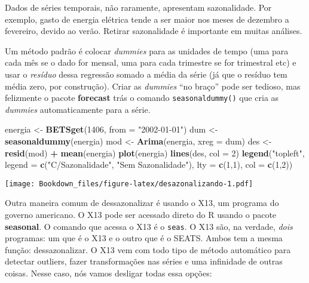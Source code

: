 \documentclass[
]{book}
\newenvironment{Shaded}{\begin{snugshade}}{\end{snugshade}}
\newcommand{\DataTypeTok}[1]{\textcolor[rgb]{0.13,0.29,0.53}{#1}}
\newcommand{\DecValTok}[1]{\textcolor[rgb]{0.00,0.00,0.81}{#1}}
\newcommand{\KeywordTok}[1]{\textcolor[rgb]{0.13,0.29,0.53}{\textbf{#1}}}
\newcommand{\NormalTok}[1]{#1}
\newcommand{\OperatorTok}[1]{\textcolor[rgb]{0.81,0.36,0.00}{\textbf{#1}}}
\newcommand{\StringTok}[1]{\textcolor[rgb]{0.31,0.60,0.02}{#1}}
\begin{document}
Dados de séries temporais, não raramente, apresentam sazonalidade. Por exemplo, gasto de energia elétrica tende a ser maior nos meses de dezembro a fevereiro, devido ao verão. Retirar sazonalidade é importante em muitas análises.

Um método padrão é colocar \emph{dummies} para as unidades de tempo (uma para cada mês se o dado for mensal, uma para cada trimestre se for trimestral etc) e usar o \emph{resíduo} dessa regressão somado a média da série (já que o resíduo tem média zero, por construção). Criar as \emph{dummies} ``no braço'' pode ser tedioso, mas felizmente o pacote \textbf{forecast} trás o comando \texttt{seasonaldummy()} que cria as \emph{dummies} automaticamente para a série.

\begin{Shaded}
\begin{Highlighting}[]
\NormalTok{energia \textless{}{-}}\StringTok{ }\KeywordTok{BETSget}\NormalTok{(}\DecValTok{1406}\NormalTok{, }\DataTypeTok{from =} \StringTok{"2002{-}01{-}01"}\NormalTok{)}
\NormalTok{dum \textless{}{-}}\StringTok{ }\KeywordTok{seasonaldummy}\NormalTok{(energia)}
\NormalTok{mod \textless{}{-}}\StringTok{ }\KeywordTok{Arima}\NormalTok{(energia, }\DataTypeTok{xreg =}\NormalTok{ dum)}
\NormalTok{des \textless{}{-}}\StringTok{ }\KeywordTok{resid}\NormalTok{(mod) }\OperatorTok{+}\StringTok{ }\KeywordTok{mean}\NormalTok{(energia)}
\KeywordTok{plot}\NormalTok{(energia)}
\KeywordTok{lines}\NormalTok{(des, }\DataTypeTok{col =} \DecValTok{2}\NormalTok{)}
\KeywordTok{legend}\NormalTok{(}\StringTok{"topleft"}\NormalTok{, }\DataTypeTok{legend =} \KeywordTok{c}\NormalTok{(}\StringTok{"C/Sazonalidade"}\NormalTok{, }\StringTok{"Sem Sazonalidade"}\NormalTok{), }\DataTypeTok{lty =} \KeywordTok{c}\NormalTok{(}\DecValTok{1}\NormalTok{,}\DecValTok{1}\NormalTok{), }\DataTypeTok{col =} \KeywordTok{c}\NormalTok{(}\DecValTok{1}\NormalTok{,}\DecValTok{2}\NormalTok{))}
\end{Highlighting}
\end{Shaded}

\texttt{[image: Bookdown\_files/figure-latex/desazonalizando-1.pdf]}

Outra maneira comum de dessazonalizar é usando o X13, um programa do governo americano. O X13 pode ser acessado direto do R usando o pacote \textbf{seasonal}. O comando que acessa o X13 é o \texttt{seas}. O X13 são, na verdade, \emph{dois} programas: um que é o X13 e o outro que é o SEATS. Ambos tem a mesma função: dessazonalizar. O X13 vem com todo tipo de método automático para detectar outliers, fazer transformações nas séries e uma infinidade de outras coisas. Nesse caso, nós vamos desligar todas essa opções:
\end{document}
